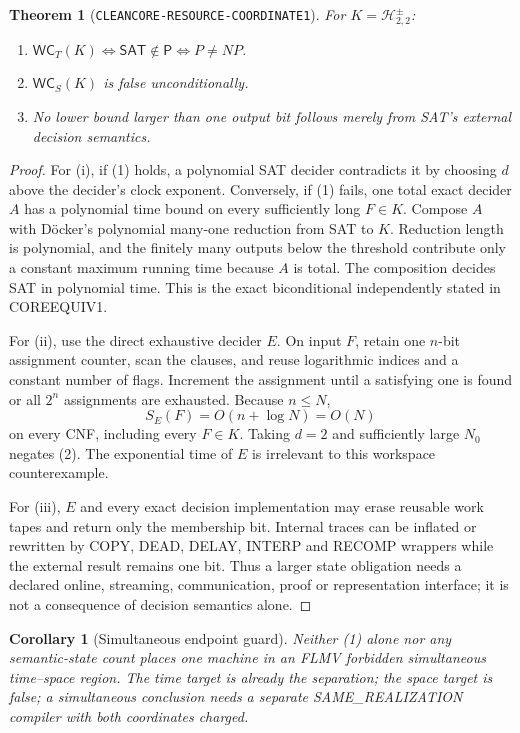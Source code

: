 \documentclass[11pt]{article}
\newtheorem{theorem}{Theorem}
\newtheorem{corollary}{Corollary}
\newcommand{\SAT}{\mathsf{SAT}}
\newcommand{\Hsigned}{\mathcal H^{\pm}_{2,2}}
\begin{document}
\begin{theorem}[\texttt{CLEANCORE-RESOURCE-COORDINATE1}]
For $K=\Hsigned$:
\begin{enumerate}[label=(\roman*)]
\item $\mathsf{WC}_T(K)\Longleftrightarrow\SAT\notin\mathsf P
\Longleftrightarrow P\ne NP$.
\item $\mathsf{WC}_S(K)$ is false unconditionally.
\item No lower bound larger than one output bit follows merely from SAT's
external decision semantics.
\end{enumerate}
\end{theorem}

\begin{proof}
For (i), if (1) holds, a polynomial SAT decider contradicts it by choosing
$d$ above the decider's clock exponent.  Conversely, if (1) fails, one total
exact decider $A$ has a polynomial time bound on every sufficiently long
$F\in K$.  Compose $A$ with D\"ocker's polynomial many-one reduction from
SAT to $K$.  Reduction length is polynomial, and the finitely many outputs
below the threshold contribute only a constant maximum running time because
$A$ is total.  The composition decides SAT in polynomial time.  This is the
exact biconditional independently stated in COREEQUIV1.

For (ii), use the direct exhaustive decider $E$.  On input $F$, retain one
$n$-bit assignment counter, scan the clauses, and reuse logarithmic indices
and a constant number of flags.  Increment the assignment until a satisfying
one is found or all $2^n$ assignments are exhausted.  Because $n\le N$,
\[
 S_E(F)=O(n+\log N)=O(N)                                    \tag{3}
\]
on every CNF, including every $F\in K$.  Taking $d=2$ and sufficiently large
$N_0$ negates (2).  The exponential time of $E$ is irrelevant to this
workspace counterexample.

For (iii), $E$ and every exact decision implementation may erase reusable
work tapes and return only the membership bit.  Internal traces can be
inflated or rewritten by COPY, DEAD, DELAY, INTERP and RECOMP wrappers while
the external result remains one bit.  Thus a larger state obligation needs a
declared online, streaming, communication, proof or representation interface;
it is not a consequence of decision semantics alone.
\end{proof}

\begin{corollary}[Simultaneous endpoint guard]
Neither (1) alone nor any semantic-state count places one machine in an FLMV
forbidden simultaneous time--space region.  The time target is already the
separation; the space target is false; a simultaneous conclusion needs a
separate SAME\_REALIZATION compiler with both coordinates charged.
\end{corollary}
\end{document}
